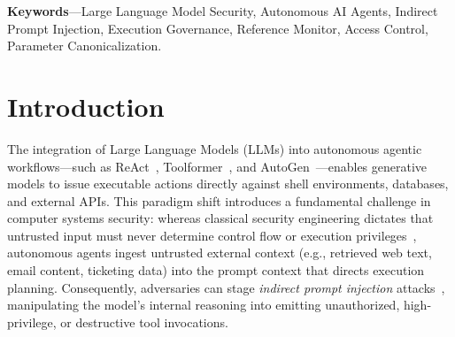 \documentclass[10pt,twocolumn,letterpaper]{article}
\begin{document}
\begin{abstract}
\textbf{Adversarial stress testing across 500 mutation instances drawn from a clustered perturbation design ($5$ classes $\times$ $100$ base templates; $2{,}000$ execution evaluations) exposes critical non-monotonic trade-offs: while structural Base64 canonicalization increases isolated evasion block rates from $0.0\%$ ($0/100$) to $50.0\%$ ($50/100$), overall isolated block rate decreases from $40.0\%$ ($200/500$) to $36.4\%$ ($182/500$) because aggressive comment stripping alters string character offsets for secondary regex rules. In compound burst testing, the standard pipeline blocks $75.2\%$ ($376/500$, $24.8\%$ ASR); however, mechanism attribution confirms that $95.74\%$ ($360/376$) of these blocks are driven by rate-limiter saturation rather than parameter inspection. In an exploratory closed-loop pilot ($N=20$) with a live commercial LLM (\texttt{gpt-oss-120b}), the proposed gateway intercepted $75.0\%$ ($3/4$) of rogue tool calls emitted following successful prompt injections, limiting unintercepted hostile tool execution to $10.0\%$ ($1/10$).}

\textbf{Our findings indicate that deterministic post-generation governance provides measurable execution mitigation against unauthorized actions, but its protection remains strictly bounded by syntactic policy expressiveness, cannot prevent parameter smuggling within authorized semantic spaces, and does not alter the underlying vulnerability of the model's reasoning.}
\end{abstract}

\vspace{0.5em}
\noindent\textbf{Keywords}---Large Language Model Security, Autonomous AI Agents, Indirect Prompt Injection, Execution Governance, Reference Monitor, Access Control, Parameter Canonicalization.

\section{Introduction}
The integration of Large Language Models (LLMs) into autonomous agentic workflows---such as ReAct~\cite{react}, Toolformer~\cite{toolformer}, and AutoGen~\cite{autogen}---enables generative models to issue executable actions directly against shell environments, databases, and external APIs. This paradigm shift introduces a fundamental challenge in computer systems security: whereas classical security engineering dictates that untrusted input must never determine control flow or execution privileges~\cite{saltzer}, autonomous agents ingest untrusted external context (e.g., retrieved web text, email content, ticketing data) into the prompt context that directs execution planning. Consequently, adversaries can stage \emph{indirect prompt injection} attacks~\cite{greshake}, manipulating the model's internal reasoning into emitting unauthorized, high-privilege, or destructive tool invocations.
\end{document}
